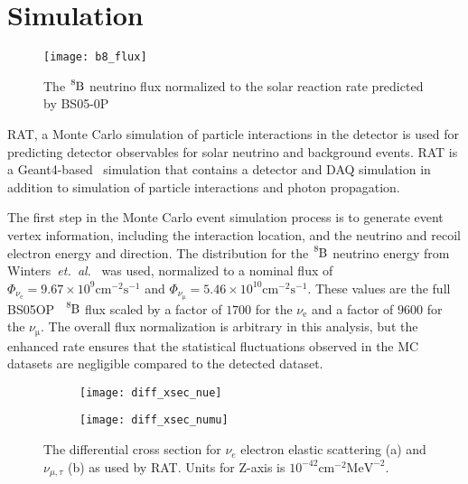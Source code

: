 \section{Simulation}
\label{sec:simulation}
\begin{figure}[htbp]
\centering
\texttt{[image: b8\_flux]}
\caption[Expected $\ce{^{8}B}$ Flux]{The $\ce{^{8}B}$ neutrino flux
normalized to the solar reaction rate predicted by BS05-0P~\citep{bs_ssm}}
\label{fig:b8_flux}
\end{figure}

RAT, a Monte Carlo simulation of particle interactions in the detector is used
for predicting detector observables for solar neutrino and background events.
RAT is a Geant4-based~\citep{geant4} simulation that
contains a detector and DAQ simulation in addition to simulation of particle
interactions and photon propagation.

The first step in the Monte Carlo event simulation process is to generate
event vertex information, including the interaction location, and the neutrino
and recoil electron energy and direction.
The distribution for the $\ce{^{8}B}$ neutrino energy from Winters~\textit{et.\ al.}~\citep{winterspectrum}
was used, normalized to a nominal flux of
$\Phi_{\nu_{\mathrm{e}}} = 9.67\times10^{9}\mathrm{cm}^{-2}\mathrm{s}^{-1}$
and
$\Phi_{\nu_{\mathrm{\mu}}} = 5.46\times10^{10}\mathrm{cm}^{-2}\mathrm{s}^{-1}$.
These values are the full BS05OP~\cite{bs_ssm} $\ce{^{8}B}$ flux scaled by a factor
of $1700$ for the $\nu_{\mathrm{e}}$ and a factor of $9600$ for the $\nu_{\mathrm{\mu}}$.
The overall flux normalization is arbitrary in this analysis, but the enhanced rate
ensures that the statistical fluctuations observed in the MC datasets are
negligible compared to the detected dataset.

\begin{figure}[htbp]
  \centering
  \begin{subfigure}[b]{0.48\textwidth}
    \centering
  \texttt{[image: diff\_xsec\_nue]}
    \caption[$\nu_{e}$ Differential Cross Section]{}
    \label{fig:diff_xsec_nue}
  \end{subfigure}
  \hfill
  \begin{subfigure}[b]{0.48\textwidth}
    \centering
  \texttt{[image: diff\_xsec\_numu]}
    \caption[$\nu_{\mu}$ Differential Cross Section]{}
    \label{fig:diff_xsec_numu}
  \end{subfigure}
    \caption[ES Differential Cross Section]{The differential cross section for $\nu_{e}$ electron
    elastic scattering (a) and $\nu_{\mu\mathrm{,}\tau}$ (b) as used by
    RAT. Units for Z-axis is $10^{-42} \mathrm{cm}^{-2} \mathrm{MeV}^{-2}$.}
    \label{fig:diff_xsec}
\end{figure}

